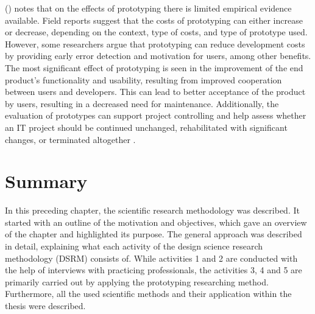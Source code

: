 \citeauthor{riedlManagementInformatik2019} (\citeyear{riedlManagementInformatik2019})
notes that on the effects of prototyping there is limited empirical evidence available.
Field reports suggest that the costs of prototyping can either increase or decrease,
depending on the context, type of costs, and type of prototype used.
However, some researchers argue that prototyping can reduce development costs
by providing early error detection and motivation for users, among other benefits.
The most significant effect of prototyping is seen in the improvement of the end product's functionality and usability,
resulting from improved cooperation between users and developers.
This can lead to better acceptance of the product by users, resulting in a decreased need for maintenance.
Additionally, the evaluation of prototypes can support project controlling and help assess whether
an IT project should be continued unchanged, rehabilitated with significant changes, or terminated altogether
\autocite{riedlManagementInformatik2019}.





\section{Summary}

In this preceding chapter, the scientific research methodology was described.
It started with an outline of the motivation and objectives,
which gave an overview of the chapter and highlighted its purpose.
The general approach was described in detail, explaining what each activity
of the design science research methodology (DSRM) consists of.
While activities 1 and 2 are conducted with the help of interviews with practicing professionals,
the activities 3, 4 and 5 are primarily carried out by applying the prototyping researching method.
Furthermore, all the used scientific methods and their application within the thesis were described.























